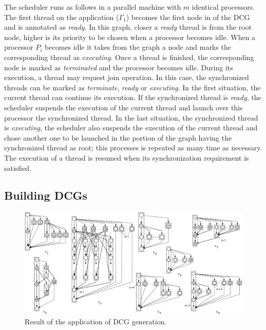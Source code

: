 \documentclass[twocolumn]{svjour3}
\begin{document}
The scheduler runs as follows in a parallel machine with $m$ identical processors. The first thread on the application ($\Gamma_1$) becomes the first node in of the DCG and is annotated as {\em ready}. In this graph, closer a {\em ready} thread is from the root node, higher is its priority to be chosen when a processor becomes idle. When a processor $P_i$ becomes idle it takes from the graph a node and marks the corresponding thread as {\em executing}. Once a thread is finished, the corresponding node is marked as {\em terminated} and the processor becomes idle. During its execution, a thread may request join operation. In this case, the synchronized threads can be marked as {\em terminate}, {\em ready} or {\em executing}. In the first situation, the current thread can continue its execution. If the synchronized thread is {\em ready}, the scheduler suspends the execution of the current thread and launch over this processor the synchronized thread. In the last situation, the synchronized thread is {\em executing}, the scheduler also suspends the execution of the current thread and chose another one to be launched in the portion of the graph having the synchronized thread as root; this processes is repeated as many time as necessary. The execution of a thread is resumed when its synchronization requirement is satisfied.

\subsection{Building DCGs}

\begin{figure}[htb]
\begin{center}
\includegraphics[width=1.0\textwidth,angle=0]{figs/transformacoes.eps}
\caption{Result of the application of DCG generation.}
\label{fig:dgcdograham}
\end{center}
\end{figure}
\end{document}
